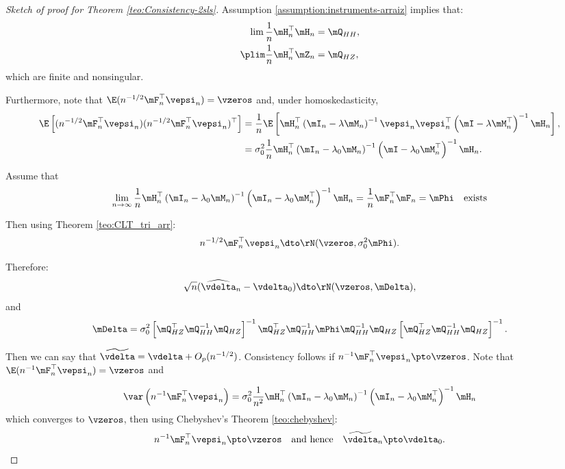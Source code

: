 \documentclass[english,12pt]{book}\usepackage[]{graphicx}\usepackage[]{xcolor}
\begin{document}
\begin{proof}[Sketch of proof for Theorem \ref{teo:Consistency-2sls}]
Assumption \ref{assumption:instruments-arraiz} implies that:
\begin{equation*}
\begin{aligned}
  \lim \frac{1}{n}\mH_n^\top\mH_n &= \mQ_{HH}, \\
  \plim \frac{1}{n}\mH_n^\top\mZ_n & = \mQ_{HZ},
\end{aligned}
\end{equation*}
%
which are finite and nonsingular. 

Furthermore, note that $\E(n^{-1/2}\mF_n^\top\vepsi_n) = \vzeros$ and, under homoskedasticity,  
\begin{equation*}
\begin{aligned}
\E\left[(n^{-1/2}\mF_n^\top\vepsi_n)(n^{-1/2}\mF_n^\top\vepsi_n)^\top\right] & = \frac{1}{n}\E\left[\mH_n^\top\left(\mI_n -\lambda\mM_n\right)^{-1}\vepsi_n\vepsi_n^\top\left(\mI -\lambda\mM_n^\top\right)^{-1} \mH_n \right], \\
& = \sigma^2_0\frac{1}{n}\mH_n^\top\left(\mI_n -\lambda_0\mM_n\right)^{-1}\left(\mI -\lambda_0\mM_n^\top\right)^{-1} \mH_n. 
\end{aligned}
\end{equation*}

Assume that 
\begin{equation*}
\lim_{n\to\infty}\frac{1}{n}\mH_n^\top\left(\mI_n -\lambda_0\mM_n\right)^{-1}\left(\mI_n -\lambda_0\mM_n^\top\right)^{-1} \mH_n = \frac{1}{n}\mF^\top_n\mF_n =\mPhi\quad \mbox{exists}
\end{equation*}

Then using Theorem \ref{teo:CLT_tri_arr}:
\begin{equation*}
n^{-1/2}\mF_n^\top\vepsi_n\dto \rN(\vzeros, \sigma^2_0\mPhi).
\end{equation*}

Therefore:
\begin{equation*}
\sqrt{n}(\widehat{\vdelta}_{n} - \vdelta_0) \dto \rN(\vzeros, \mDelta),
\end{equation*}
%
and
\begin{equation*}
  \mDelta = \sigma^2_{0}\left[\mQ_{HZ}^\top\mQ_{HH}^{-1}\mQ_{HZ}\right]^{-1}\mQ_{HZ}^\top\mQ_{HH}^{-1}\mPhi\mQ_{HH}^{-1}\mQ_{HZ}\left[\mQ_{HZ}^\top\mQ_{HH}^{-1}\mQ_{HZ}\right]^{-1}.
\end{equation*}

Then we can say that $\widetilde{\vdelta} = \vdelta + O_p(n^{-1/2})$. Consistency follows if $n^{-1}\mF_n^\top\vepsi_n\pto \vzeros$. Note that $\E(n^{-1}\mF_n^\top\vepsi_n) = \vzeros$ and 

\begin{equation*}
\var\left(n^{-1}\mF_n^\top\vepsi_n\right)=\sigma^2_0\frac{1}{n^2}\mH_n^\top\left(\mI_n -\lambda_0\mM_n\right)^{-1}\left(\mI_n -\lambda_0\mM_n^\top\right)^{-1} \mH_n 
\end{equation*}
%
which converges to $\vzeros$, then using Chebyshev's Theorem \ref{teo:chebyshev}:
\begin{equation*}
  n^{-1}\mF_n^\top\vepsi_n\pto \vzeros\quad\mbox{and hence}\quad \widetilde{\vdelta}_n\pto\vdelta_0.
\end{equation*}
\end{proof}
\end{document}
